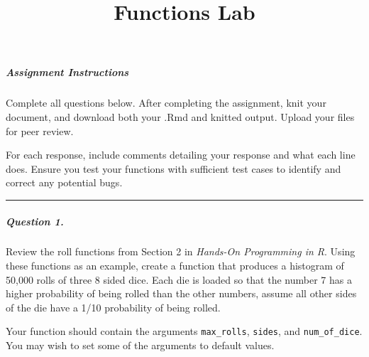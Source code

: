 \documentclass[
]{article}
\title{Functions Lab}
\author{}
\date{\vspace{-2.5em}}
\begin{document}
\maketitle

\hypertarget{assignment-instructions}{%
\subparagraph{Assignment Instructions}\label{assignment-instructions}}

Complete all questions below. After completing the assignment, knit your
document, and download both your .Rmd and knitted output. Upload your
files for peer review.

For each response, include comments detailing your response and what
each line does. Ensure you test your functions with sufficient test
cases to identify and correct any potential bugs.

\begin{center}\rule{0.5\linewidth}{0.5pt}\end{center}

\hypertarget{question-1.}{%
\subparagraph{Question 1.}\label{question-1.}}

Review the roll functions from Section 2 in \emph{Hands-On Programming
in R}. Using these functions as an example, create a function that
produces a histogram of 50,000 rolls of three 8 sided dice. Each die is
loaded so that the number 7 has a higher probability of being rolled
than the other numbers, assume all other sides of the die have a 1/10
probability of being rolled.

Your function should contain the arguments \texttt{max\_rolls},
\texttt{sides}, and \texttt{num\_of\_dice}. You may wish to set some of
the arguments to default values.
\end{document}
